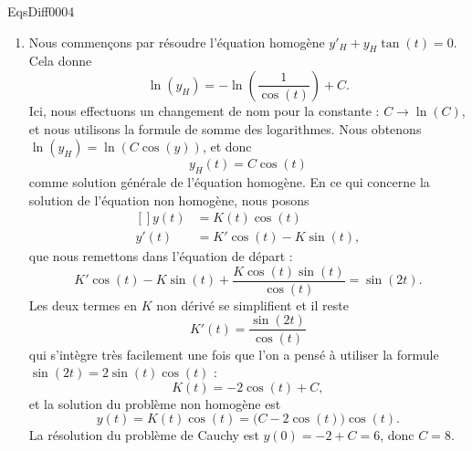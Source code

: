 \begin{corrige}{EqsDiff0004}
\begin{enumerate}
\item
Nous commençons par résoudre l'équation homogène $y'_H+y_H\tan(t)=0$. Cela donne
\begin{equation}
	\ln(y_H)=-\ln\left( \frac{1}{ \cos(t) } \right)+C.
\end{equation}
Ici, nous effectuons un changement de nom pour la constante : $C\to \ln(C)$, et nous utilisons la formule de somme des logarithmes. Nous obtenons $\ln(y_H)=\ln(C\cos(y))$, et donc
\begin{equation}
	y_H(t)=C\cos(t)
\end{equation}
comme solution générale de l'équation homogène. En ce qui concerne la solution de l'équation non homogène, nous posons
\begin{equation}
	\begin{aligned}[]
		y(t)&=K(t)\cos(t)\\
		y'(t)&=K'\cos(t)-K\sin(t),
	\end{aligned}
\end{equation}
que nous remettons dans l'équation de départ :
\begin{equation}
	K'\cos(t)-K\sin(t)+\frac{ K\cos(t)\sin(t) }{ \cos(t) }=\sin(2t).
\end{equation}
Les deux termes en $K$ non dérivé se simplifient et il reste
\begin{equation}
	K'(t)=\frac{ \sin(2t) }{ \cos(t) }
\end{equation}
qui s'intègre très facilement une fois que l'on a pensé à utiliser la formule $\sin(2t)=2\sin(t)\cos(t)$ :
\begin{equation}
	K(t)=-2\cos(t)+C,
\end{equation}
et la solution du problème non homogène est
\begin{equation}
	y(t)=K(t)\cos(t)=\big( C-2\cos(t) \big)\cos(t).
\end{equation}
La résolution du problème de Cauchy est $y(0)=-2+C=6$, donc $C=8$.


\end{enumerate}
\end{corrige}
